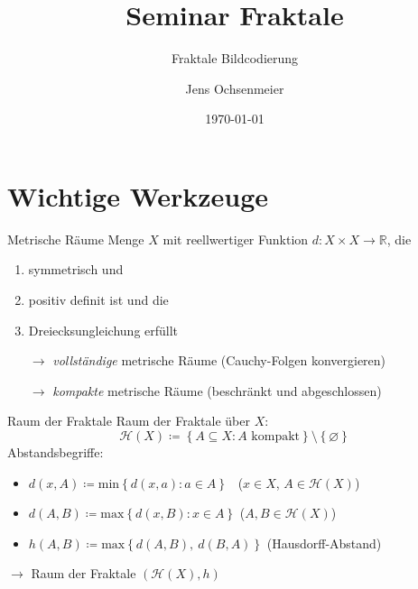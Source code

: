 \documentclass[10pt]{beamer}
\title{Seminar Fraktale}
\subtitle{Fraktale Bildcodierung}
\date{\today}
\author{Jens Ochsenmeier}
\newcommand{\R}{\mathbb{R}}
\renewcommand{\min}{\text{min}}
\renewcommand{\max}{\text{max}}
\begin{document}
\maketitle


\section{Wichtige Werkzeuge}

%
%
\begin{frame}{Metrische Räume}
  Menge \( X \) mit reellwertiger Funktion \( d: X \times X \to \R \), die
  \begin{enumerate}
    \item \alert{symmetrisch} und
    \item \alert{positiv definit} ist und die
    \item \alert{Dreiecksungleichung} erfüllt 
  \end{enumerate}
  \pause{}
  \begin{itemize}
    \item[\( \to \)] \emph{vollständige} metrische Räume (Cauchy-Folgen konvergieren)
    \pause{}
    \item[\( \to \)] \emph{kompakte} metrische Räume (beschränkt und abgeschlossen)
  \end{itemize}
\end{frame}

%
%
\begin{frame}{Raum der Fraktale}
  Raum der Fraktale über \( X \):
  \begin{equation*}
    \mathcal{H}(X) \coloneqq \left \{ A \subseteq X : A \text{ kompakt} \right \} \setminus \left \{ \varnothing \right \}
  \end{equation*}
  \pause{}
  \alert{Abstandsbegriffe}:
  \begin{itemize}
    \item \( d(x,A) \coloneqq \min\left \{ d(x,a) : a \in A \right \} \) \quad \ (\( x \in X \), \( A \in \mathcal{H}(X) \))
    \item \( d(A,B) \coloneqq \max\left \{ d(x,B) : x \in A \right \} \) \quad (\( A, B \in \mathcal{H}(X) \))
    \pause{}
    \item \( h(A,B) \coloneqq \max\left \{ d(A,B),\ d(B,A) \right \} \) (Hausdorff-Abstand)
  \end{itemize}
  \pause{}
  \( \to \) \alert{Raum der Fraktale} \( (\mathcal{H}(X), h) \)
\end{frame}
\end{document}

